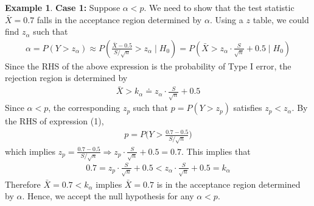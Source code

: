 \documentclass{tufte-book}
\theoremstyle{definition}
\numberwithin{theorem}{section}
\numberwithin{definition}{section}
\numberwithin{lemma}{section}
\numberwithin{corollary}{section}
\numberwithin{proposition}{section}
\numberwithin{remark}{section}
\numberwithin{claim}{section}
\numberwithin{observation}{section}
\numberwithin{fact}{section}
\numberwithin{assumption}{section}
\newtheorem{example}[theorem]{Example}
\numberwithin{example}{section}
\numberwithin{exercise}{section}
\begin{document}
\begin{example}
\textbf{Case 1:} Suppose $\alpha < p$. We need to show that the test statistic $\bar{X} = 0.7$ falls in the acceptance region determined by $\alpha$. Using a $z$ table, we could find $z_{\alpha}$ such that
\begin{align*}
\alpha = P(Y > z_{\alpha}) \approx P(\frac{\bar{X}-0.5}{S/\sqrt{n}} > z_{\alpha} \mid H_0) = P(\bar{X} > z_{\alpha} \cdot \frac{S}{\sqrt{n}} + 0.5 \mid H_0)
\end{align*}
Since the RHS of the above expression is the probability of Type I error, the rejection region is determined by
\begin{align*}
\bar{X} > k_{\alpha} \doteq z_{\alpha} \cdot \frac{S}{\sqrt{n}} + 0.5
\end{align*}
Since $\alpha < p$, the corresponding $z_{p}$ such that $p = P(Y > z_p)$ satisfies $z_p < z_{\alpha}$. By the RHS of expression (1),
\begin{align*}
p = P\Big(Y > \frac{0.7 - 0.5}{S/\sqrt{n}} \Big)
\end{align*}
which implies $z_p = \frac{0.7 - 0.5}{S/\sqrt{n}} \Rightarrow  z_p \cdot \frac{S}{\sqrt{n}} + 0.5 = 0.7$. This implies that
\begin{align*}
0.7 = z_p \cdot \frac{S}{\sqrt{n}} + 0.5 <  z_{\alpha} \cdot \frac{S}{\sqrt{n}} + 0.5 = k_{\alpha}
\end{align*}
Therefore $\bar{X} = 0.7 < k_{\alpha}$ implies $\bar{X} = 0.7$ is in the acceptance region determined by $\alpha$. Hence, we accept the null hypothesis for any $\alpha < p$.


\end{example}
\end{document}
